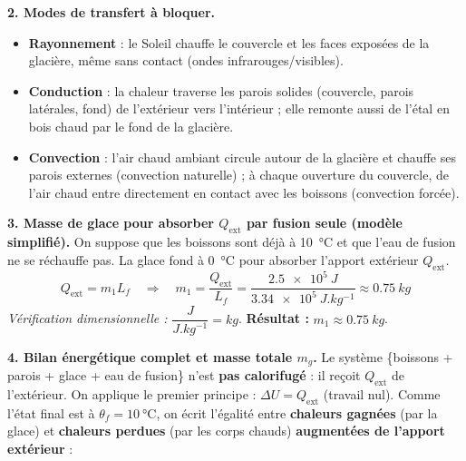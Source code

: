 \documentclass[11pt]{article}
\begin{document}
\begin{exoresolu}
\textbf{2. Modes de transfert à bloquer.}
\begin{itemize}
\item \textbf{Rayonnement} : le Soleil chauffe le couvercle et les faces exposées de la glacière, même sans contact (ondes infrarouges/visibles).
\item \textbf{Conduction} : la chaleur traverse les parois solides (couvercle, parois latérales, fond) de l'extérieur vers l'intérieur ; elle remonte aussi de l'étal en bois chaud par le fond de la glacière.
\item \textbf{Convection} : l'air chaud ambiant circule autour de la glacière et chauffe ses parois externes (convection naturelle) ; à chaque ouverture du couvercle, de l'air chaud entre directement en contact avec les boissons (convection forcée).
\end{itemize}

\textbf{3. Masse de glace pour absorber $Q_{\text{ext}}$ par fusion seule (modèle simplifié).}
On suppose que les boissons sont déjà à \SI{10}{\celsius} et que l'eau de fusion ne se réchauffe pas. La glace fond à \SI{0}{\celsius} pour absorber l'apport extérieur $Q_{\text{ext}}$.
\[ Q_{\text{ext}} = m_1 L_f \quad \Rightarrow \quad m_1 = \frac{Q_{\text{ext}}}{L_f} = \frac{\num{2,5e5}\ \si{J}}{\num{3,34e5}\ \si{J.kg^{-1}}} \approx \SI{0,75}{kg} \]
\textit{Vérification dimensionnelle :} $\dfrac{\si{J}}{\si{J.kg^{-1}}} = \si{kg}$. \textbf{Résultat :} $m_1 \approx \SI{0,75}{kg}$.

\textbf{4. Bilan énergétique complet et masse totale $m_g$.}
Le système \{boissons + parois + glace + eau de fusion\} n'est \textbf{pas calorifugé} : il reçoit $Q_{\text{ext}}$ de l'extérieur. On applique le premier principe : $\Delta U = Q_{\text{ext}}$ (travail nul). Comme l'état final est à $\theta_f = \SI{10}{\celsius}$, on écrit l'égalité entre \textbf{chaleurs gagnées} (par la glace) et \textbf{chaleurs perdues} (par les corps chauds) \textbf{augmentées de l'apport extérieur} :


\end{exoresolu}
\end{document}
